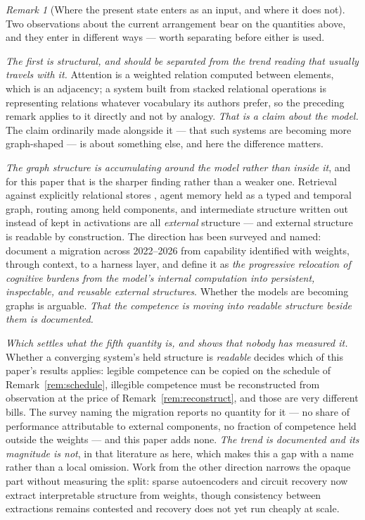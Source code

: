 \documentclass[11pt,a4paper]{article}
\theoremstyle{remark}
\newtheorem{remark}[definition]{Remark}
\begin{document}
\begin{remark}[Where the present state enters as an input, and where it does not]\label{rem:present}
Two observations about the current arrangement bear on the quantities above, and they enter in
different ways --- worth separating before either is used.

\emph{The first is structural, and should be separated from the trend reading that usually travels with
it.} Attention is a weighted relation computed between elements, which is an adjacency; a system built
from stacked relational operations is representing relations whatever vocabulary its authors prefer, so
the preceding remark applies to it directly and not by analogy. \emph{That is a claim about the model.}
The claim ordinarily made alongside it --- that such systems are becoming more graph-shaped --- is about
something else, and here the difference matters.

\emph{The graph structure is accumulating around the model rather than inside it}, and for this paper
that is the sharper finding rather than a weaker one. Retrieval against explicitly relational stores
\citep{edge2024}, agent memory held as a typed and temporal graph, routing among held components, and
intermediate structure written out instead of kept in activations are all \emph{external} structure ---
and external structure is readable by construction. The direction has been surveyed and named:
\citet{zhou2026} document a migration across 2022--2026 from capability identified with weights, through
context, to a harness layer, and define it as \emph{the progressive relocation of cognitive burdens from
the model's internal computation into persistent, inspectable, and reusable external structures}.
Whether the models are becoming graphs is arguable. \emph{That the competence is moving into readable
structure beside them is documented.}

\emph{Which settles what the fifth quantity is, and shows that nobody has measured it.} Whether a
converging system's held structure is \emph{readable} decides which of this paper's results applies:
legible competence can be copied on the schedule of Remark~\ref{rem:schedule}, illegible competence must
be reconstructed from observation at the price of Remark~\ref{rem:reconstruct}, and those are very
different bills. The survey naming the migration reports no quantity for it --- no share of performance
attributable to external components, no fraction of competence held outside the weights --- and this
paper adds none. \emph{The trend is documented and its magnitude is not}, in that literature as here,
which makes this a gap with a name rather than a local omission. Work from the other direction narrows
the opaque part without measuring the split: sparse autoencoders and circuit recovery now extract
interpretable structure from weights, though consistency between extractions remains contested and
recovery does not yet run cheaply at scale.


\end{remark}
\end{document}
